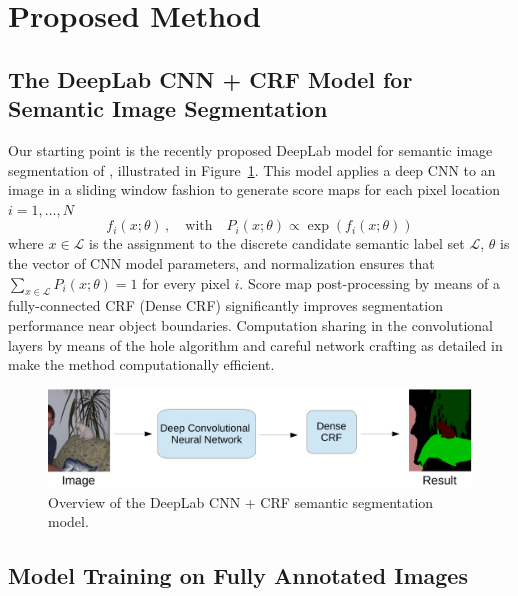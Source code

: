 \section{Proposed Method}

\subsection{The DeepLab CNN + CRF Model for Semantic Image Segmentation}

Our starting point is the recently proposed DeepLab model for semantic
image segmentation of \citet{chen2014semantic}, illustrated in
Figure~\ref{fig:model_test}. This model applies a deep CNN to an image
in a sliding window fashion to generate score maps for each pixel
location $i = 1, \dots, N$
\begin{equation}
  \label{eq:scores}
  f_i(x; \theta) \,,
  \quad \mathrm{with} \quad
  P_i(x; \theta) \propto \exp \left( f_i(x; \theta) \right)
\end{equation}
where $x \in \mathcal{L}$ is the assignment to the discrete candidate
semantic label set $\mathcal{L}$, $\theta$ is the vector of CNN model
parameters, and normalization ensures that $\sum_{x \in  \mathcal{L}}
P_i(x; \theta) = 1$ for every pixel $i$. Score map post-processing by
means of a fully-connected CRF (Dense CRF)
\cite{krahenbuhl2011efficient} significantly improves segmentation
performance near object boundaries. Computation sharing in the
convolutional layers by means of the hole algorithm and careful
network crafting as detailed in \citet{chen2014semantic} make the
method computationally efficient.

\begin{figure}[htbp!]
  \centering
  \includegraphics[width=0.9\linewidth]{fig/model_test.pdf} 
  \caption{Overview of the DeepLab CNN + CRF semantic segmentation model.}
  \label{fig:model_test}
\end{figure}

\subsection{Model Training on Fully Annotated Images}
\label{sec:train_pixel}

